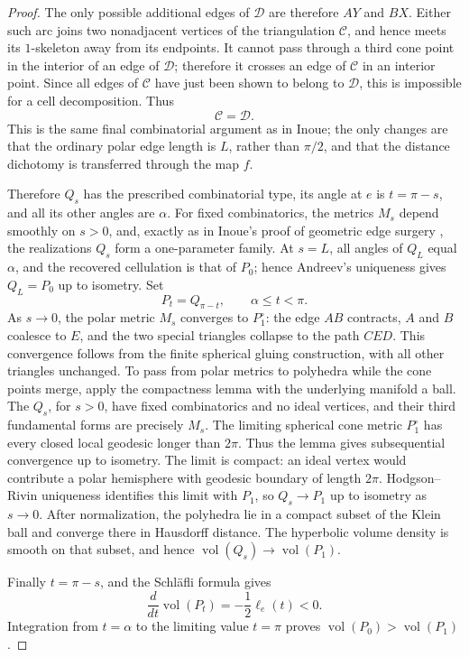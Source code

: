\documentclass[12pt,a4paper]{article}
\theoremstyle{definition}
\DeclareMathOperator{\Vol}{vol}
\begin{document}
\begin{proof}
The only possible additional edges of \(\mathcal D\) are therefore \(AY\)
and \(BX\). Either such arc joins two nonadjacent vertices of the triangulation
\(\mathcal C\), and hence meets its \(1\)-skeleton away from its endpoints.
It cannot pass through a third cone point in the interior of an edge of
\(\mathcal D\); therefore it crosses an edge of \(\mathcal C\) in an
interior point. Since all edges of \(\mathcal C\) have just been shown to belong to
\(\mathcal D\), this is impossible for a cell decomposition. Thus
\[
        \mathcal C=\mathcal D.
\]
This is the same final combinatorial argument as in Inoue; the only changes
are that the ordinary polar edge length is \(L\), rather than \(\pi/2\), and
that the distance dichotomy is transferred through the map \(f\).

Therefore \(Q_s\) has the prescribed combinatorial type, its angle at \(e\)
is \(t=\pi-s\), and all its other angles are \(\alpha\). For fixed
combinatorics, the metrics \(M_s\) depend smoothly on \(s>0\), and, exactly
as in Inoue's proof of geometric edge surgery
\cite[proof of Theorem~8.2]{Inoue2008}, the realizations \(Q_s\) form a
one-parameter family. At \(s=L\), all angles of \(Q_L\) equal \(\alpha\), and
the recovered cellulation is that of \(P_0\); hence Andreev's uniqueness
gives \(Q_L=P_0\) up to isometry. Set
\[
        P_t=Q_{\pi-t},\qquad \alpha\le t<\pi.
\]
As \(s\to0\), the polar metric \(M_s\) converges to \(P_1^\circ\): the edge
\(AB\) contracts, \(A\) and \(B\) coalesce to \(E\), and the two special
triangles collapse to the path \(CED\). This convergence follows from the
finite spherical gluing construction, with all other triangles unchanged.
To pass from polar metrics to polyhedra while the cone points merge, apply
the compactness lemma \cite[Lemma~6.3]{SchlenkerHyperideal} with the underlying
manifold a ball. The \(Q_s\), for \(s>0\), have fixed combinatorics and no
ideal vertices, and their third fundamental forms are precisely \(M_s\).
The limiting spherical cone metric \(P_1^\circ\) has every closed local
geodesic longer than \(2\pi\). Thus the lemma gives subsequential convergence
up to isometry. The limit is compact: an ideal vertex would contribute a
polar hemisphere with geodesic boundary of length \(2\pi\).
Hodgson--Rivin uniqueness identifies this limit with \(P_1\), so
\(Q_s\to P_1\) up to isometry as \(s\to0\). After normalization, the
polyhedra lie in a compact subset of the Klein ball and converge there in
Hausdorff distance. The hyperbolic volume density is smooth on that subset,
and hence \(\Vol(Q_s)\to\Vol(P_1)\).

Finally \(t=\pi-s\), and the Schl\"afli formula gives
\[
        \frac{d}{dt}\Vol(P_t)=-\frac12\ell_e(t)<0.
\]
Integration from \(t=\alpha\) to the limiting value \(t=\pi\) proves
\(\Vol(P_0)>\Vol(P_1)\).
\end{proof}
\end{document}
